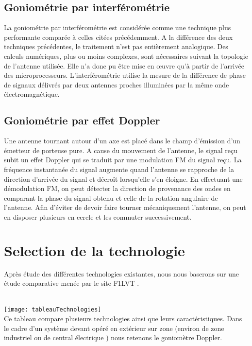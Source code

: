 \subsection{Goniométrie par interférométrie}

	La goniométrie par interférométrie est considérée comme une technique plus performante comparée à celles citées précédemment. A la différence des deux techniques précédentes, le traitement n’est pas entièrement analogique. Des calculs numériques, plus ou moins complexes, sont nécessaires suivant la topologie de l’antenne utilisée. Elle n’a donc pu être mise en œuvre qu’à partir de l’arrivée des microprocesseurs.
L’interférométrie utilise la mesure de la différence de phase de signaux délivrés par deux antennes proches illuminées par la même onde électromagnétique.

\subsection{Goniométrie par effet Doppler}

	Une antenne tournant autour d'un axe est placé dans le champ d'émission d'un émetteur de porteuse pure. A cause du mouvement de l'antenne, le signal reçu subit un effet Doppler qui se traduit par une modulation FM du signal reçu. La fréquence instantanée du signal augmente quand l’antenne se rapproche de la direction d’arrivée du signal et décroît lorsqu’elle s’en éloigne. En effectuant une démodulation FM, on peut détecter la direction de provenance des ondes en comparant la phase du signal obtenu et celle de la rotation angulaire de l’antenne. 
Afin d'éviter de devoir faire tourner mécaniquement l'antenne, on peut en disposer plusieurs en cercle et les commuter successivement.

\section{Selection de la technologie}

	Après étude des différentes technologies existantes, nous nous baserons sur une étude comparative menée par le site F1LVT \cite{montreal}.

~\\	
	\texttt{[image: tableauTechnologies]}
\parindent=15pt
~\\

	Ce tableau compare plusieurs technologies ainsi que leurs caractéristiques. Dans le cadre d’un système devant opéré en extérieur sur zone (environ de zone industriel ou de central électrique ) nous retenons le goniomètre Doppler.

